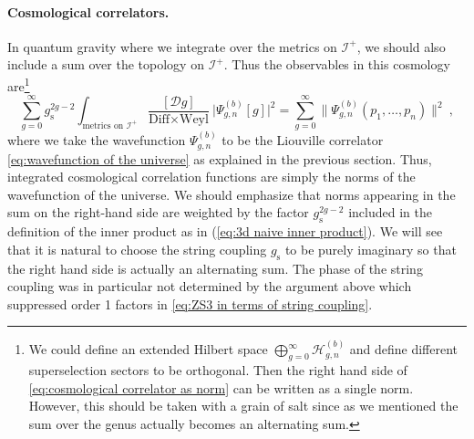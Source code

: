 \documentclass[12pt,a4paper]{article}
\newcommand{\be}{\begin{equation}}
\newcommand{\ee}{\end{equation}}
\begin{document}
\paragraph{Cosmological correlators.} In quantum gravity where we integrate over the metrics on $\mathcal{I}^+$, we should also include a sum over the topology on $\mathcal{I}^+$. Thus the observables in this cosmology are\footnote{We could define an extended Hilbert space $\bigoplus_{g=0}^\infty \mathcal{H}_{g,n}^{(b)}$ and define different superselection sectors to be orthogonal. Then the right hand side of \eqref{eq:cosmological correlator as norm} can be written as a single norm. However, this should be taken with a grain of salt since as we mentioned the sum over the genus actually becomes an alternating sum.}
\be 
\sum_{g=0}^\infty g_\text{s}^{2g-2} \int_{\text{metrics on $\mathcal{I}^+$}} \frac{[\mathcal{D} g]}{\text{Diff} \times \text{Weyl}}\ \big|\Psi_{g,n}^{(b)}[g]\big|^2=\sum_{g=0}^\infty \big\lVert \Psi_{g,n}^{(b)}(p_1,\dots,p_n) \big\rVert^2~ ,\label{eq:cosmological correlator as norm}
\ee
where we take the wavefunction $\Psi_{g,n}^{(b)}$ to be the Liouville correlator \eqref{eq:wavefunction of the universe} as explained in the previous section. 
Thus, integrated cosmological correlation functions are simply the norms of the wavefunction of the universe. We should emphasize that norms appearing in the sum on the right-hand side are weighted by the factor $g_{\text{s}}^{2g-2}$ included in the definition of the inner product as in (\ref{eq:3d naive inner product}). We will see that it is natural to choose the string coupling $g_{\text{s}}$ to be purely imaginary so that the right hand side is actually an alternating sum. The phase of the string coupling was in particular not determined by the argument above which suppressed order 1 factors in \eqref{eq:ZS3 in terms of string coupling}.
\end{document}
